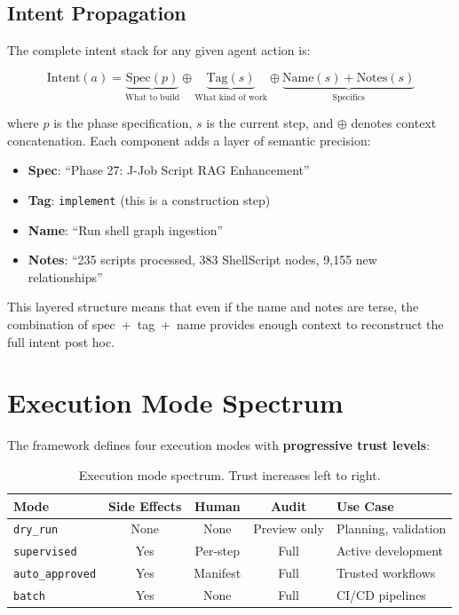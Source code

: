 \documentclass[11pt,letterpaper]{article}
\begin{document}
\subsection{Intent Propagation}

The complete intent stack for any given agent action is:

\begin{equation}
\label{eq:intent}
\text{Intent}(a) = \underbrace{\text{Spec}(p)}_{\text{What to build}}
    \oplus \underbrace{\text{Tag}(s)}_{\text{What kind of work}}
    \oplus \underbrace{\text{Name}(s) + \text{Notes}(s)}_{\text{Specifics}}
\end{equation}

\noindent where $p$ is the phase specification, $s$ is the current step,
and $\oplus$ denotes context concatenation.  Each component adds a
layer of semantic precision:

\begin{itemize}[nosep]
    \item \textbf{Spec}: ``Phase 27: J-Job Script RAG Enhancement''
    \item \textbf{Tag}: \texttt{implement} (this is a construction step)
    \item \textbf{Name}: ``Run shell graph ingestion''
    \item \textbf{Notes}: ``235 scripts processed, 383 ShellScript nodes,
          9{,}155 new relationships''
\end{itemize}

This layered structure means that even if the name and notes are terse,
the combination of spec~+~tag~+~name provides enough context to
reconstruct the full intent post hoc.

\section{Execution Mode Spectrum}
\label{sec:modes}

The framework defines four execution modes with \textbf{progressive
trust levels}:

\begin{table}[h]
\centering
\caption{Execution mode spectrum.  Trust increases left to right.}
\label{tab:modes}
\begin{tabular}{@{}lcccl@{}}
\toprule
\textbf{Mode} & \textbf{Side Effects} & \textbf{Human} & \textbf{Audit} & \textbf{Use Case} \\
\midrule
\texttt{dry\_run}       & None     & None       & Preview only  & Planning, validation \\
\texttt{supervised}     & Yes      & Per-step   & Full          & Active development \\
\texttt{auto\_approved} & Yes      & Manifest   & Full          & Trusted workflows \\
\texttt{batch}          & Yes      & None       & Full          & CI/CD pipelines \\
\bottomrule
\end{tabular}
\end{table}
\end{document}
